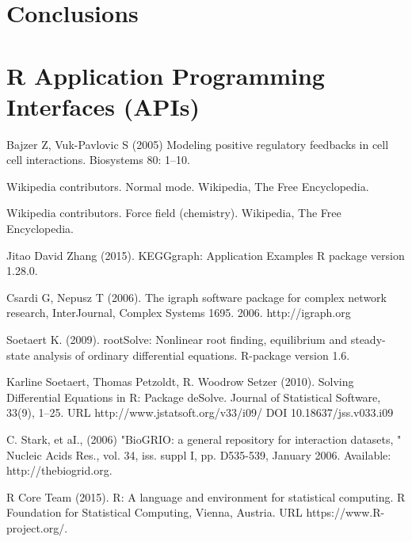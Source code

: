 \section{Conclusions}


\section{R Application Programming Interfaces (APIs)}





\begin{thebibliography}{00}

 Bajzer Z, Vuk-Pavlovic S (2005)  
\newblock Modeling positive regulatory feedbacks in cell cell interactions. 
\newblock Biosystems 80: 1–10. 

Wikipedia contributors. 
\newblock Normal mode.
\newblock Wikipedia, The Free Encyclopedia.

Wikipedia contributors. 
\newblock Force field (chemistry).
\newblock Wikipedia, The Free Encyclopedia.

 Jitao David Zhang (2015). 
\newblock KEGGgraph: Application Examples
\newblock R package version 1.28.0.

Csardi G, Nepusz T (2006).
\newblock The igraph software package for complex network research,
\newblock  InterJournal, Complex Systems 1695. 2006. http://igraph.org

Soetaert K. (2009).  
\newblock rootSolve: Nonlinear root finding, equilibrium and steady-state analysis of ordinary differential equations.  
\newblock R-package version 1.6.

Karline Soetaert, Thomas Petzoldt, R. Woodrow Setzer (2010). 
\newblock Solving Differential Equations in R: Package deSolve. 
\newblock Journal of Statistical Software, 33(9), 1--25. URL http://www.jstatsoft.org/v33/i09/ DOI 10.18637/jss.v033.i09

C. Stark, et aI., (2006)
\newblock "BioGRIO: a general repository for interaction datasets, " 
\newblock Nucleic Acids Res., vol. 34, iss. suppl I, pp. D535-539, January 2006. Available: http://thebiogrid.org. 

R Core Team (2015). 
\newblock R: A language and environment for statistical computing. R Foundation for Statistical Computing, Vienna, Austria.
\newblock URL https://www.R-project.org/.

\end{thebibliography}

